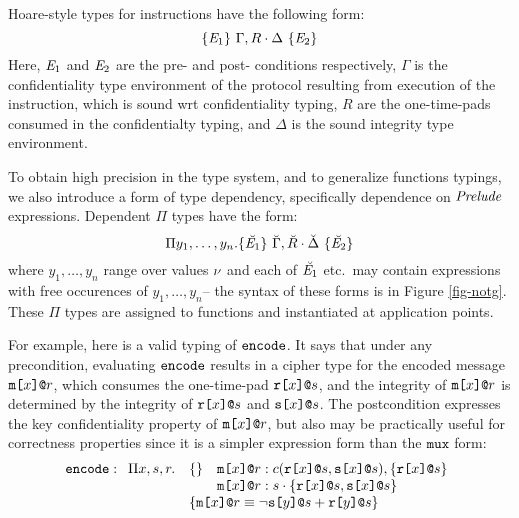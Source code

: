 Hoare-style types for instructions have the following form:
$$
\{ \mathit{E}_1 \}\ \Gamma,R \cdot \Delta\ \{ \mathit{E}_2 \}
$$
Here, $\mathit{E}_1$ and $\mathit{E}_2$ are the pre- and post- conditions
respectively, $\Gamma$ is the confidentiality type environment of the
protocol resulting from execution of the instruction, which is sound
wrt confidentiality typing, $R$ are the one-time-pads consumed in the
confidentialty typing, and $\Delta$ is the sound integrity type
environment.

\notgfig

To obtain high precision in the type system, and to generalize
functions typings, we also introduce a form of type dependency,
specifically dependence on $\mathit{Prelude}$ expressions. Dependent
$\Pi$ types have the form:
$$
\Pi y_1,\ldots,y_n . \{ \breve{\mathit{E}_1} \}\ \breve{\Gamma},\breve{R} \cdot \breve{\Delta}\ \{ \breve{\mathit{E}_2} \}
$$
where $y_1,\ldots,y_n$ range over values $\nu$ and each of
$\breve{\mathit{E}_1}$ etc.~may contain expressions with free occurences
of $y_1,\ldots,y_n$-- the syntax of these forms is in Figure
\ref{fig-notg}. These $\Pi$ types are assigned to functions
and instantiated at application points. 

For example, here is a valid typing of $\texttt{encode}$.  It says that
under any precondition, evaluating $\texttt{encode}$ results in a cipher
type for the encoded message $\texttt{m[}x\texttt{]}\texttt{@}r$, which consumes the
one-time-pad $\texttt{r[}x\texttt{]}\texttt{@}s$, and the integrity of $\texttt{m[}x\texttt{]}\texttt{@}r$ is
determined by the integrity of $\texttt{r[}x\texttt{]}\texttt{@}s$ and $\texttt{s[}x\texttt{]}\texttt{@}s$. The
postcondition expresses the key confidentiality property of
$\texttt{m[}x\texttt{]}\texttt{@}r$, but also may be practically useful for correctness
properties since it is a simpler expression form than the $\texttt{mux}$
form:
$$
\ttt{encode} :
\begin{array}[t]{ll}
  \Pi x,s,r . & \{ \} \quad \mx{x}{r} : \cty{\rx{x}{s}}{\sx{x}{s}}, \{ \rx{x}{s} \} \\
  & \phantom{\{ \}} \quad \mx{x}{r} : \ity{s}{\{ \rx{x}{s}, \sx{x}{s} \}} \\
  & \{ \mx{x}{r} \eop \neg\sx{y}{s} \fplus \rx{y}{s} \}
\end{array}
$$


